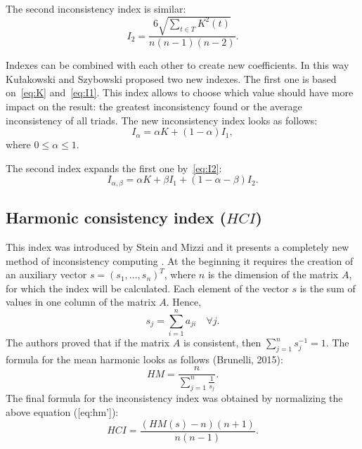 The second inconsistency index is similar:
	\begin{equation} 
	 \label{eq:I2}				
		I_{2}=\frac{6\sqrt{\sum_{t\in T}K^{2}(t)}}{n(n-1)(n-2)}.
	 \end{equation}

Indexes can be combined with each other to create new coefficients. In this way Kułakowski and Szybowski proposed two new indexes. The first one is based on~\ref{eq:K} and~\ref{eq:I1}. This index allows to choose which value should have more impact on the result: the greatest inconsistency found or the average inconsistency of all triads. The new inconsistency index looks as follows:
	\begin{equation} 
		I_{\alpha}=\alpha K+(1-\alpha)I_{1},
	 \end{equation}
 where $0\leq\alpha\leq1$.
  
The second index expands the first one by~\ref{eq:I2}:
	\begin{equation} 
		I_{\alpha,\beta}=\alpha K+\beta I_{1}+(1-\alpha-\beta)I_{2}.
	 \end{equation}
 

\subsection{Harmonic consistency index ($HCI$)}

This index was introduced by Stein and Mizzi and it presents a completely new method of inconsistency computing \cite{STEIN2007}. At the beginning it requires the creation of an auxiliary vector $s=(s_{1},...,s_{n})^{T}$, where $n$ is the dimension of the matrix $A$, for which the index will be calculated. Each element of the vector $s$ is the sum of values in one column of the matrix $A$. Hence, 
	\begin{equation} 
		s_{j}=\sum_{i=1}^{n}a_{ji}\,\,\,\,\,\,\forall j.
	 \end{equation}
 The authors proved that if the matrix $A$ is consistent, then $\sum_{j=1}^{n}s_{j}^{-1}=1$. The formula for the mean harmonic looks as follows (Brunelli, 2015):
 	\begin{equation} 
		HM=\frac{n}{\sum_{j=1}^{n}\frac{1}{s_{j}}}.
	 \end{equation}
 The final formula for the inconsistency index was obtained by normalizing the above equation ([eq:hm']):
 	\begin{equation} 
		HCI=\frac{\left(HM(s)-n\right)\left(n+1\right)}{n(n-1)}.
	 \end{equation}
 

